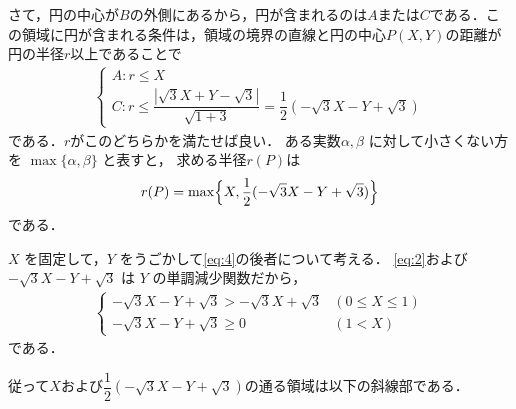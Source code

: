 \documentclass[../../main.tex]{subfiles}
\begin{document}
さて，円の中心が$B$の外側にあるから，円が含まれるのは$A$または$C$である．こ
の領域に円が含まれる条件は，領域の境界の直線と円の中心$P(X,Y)$の距離が円の半径$r$以上であることで
\begin{align}
  \begin{cases}
    A: r \le X \\
    C: r \le \dfrac{|\sqrt{3}X + Y - \sqrt{3}|}{\sqrt{1+3}} = \dfrac{1}{2}(-\sqrt{3}X - Y + \sqrt{3})
  \end{cases} \label{eq:3}
\end{align}
である．$r$がこのどちらかを満たせば良い．
ある実数$\alpha, \beta$ に対して小さくない方を $\max\{\alpha, \beta\}$ と表すと，
求める半径$r(P)$は
\begin{align}
  r(P) = \max\Bigl\{ X, \dfrac{1}{2}(-\sqrt{3}X - Y + \sqrt{3}) \Bigr\} \label{eq:4}
\end{align}
である．

$X$ を固定して，$Y$ をうごかして\cref{eq:4}の後者について考える．
\cref{eq:2}および$-\sqrt{3}X - Y + \sqrt{3}$ は $Y$ の単調減少関数だから，
\begin{align}
  \begin{cases}
    -\sqrt{3}X - Y + \sqrt{3} > -\sqrt{3}X + \sqrt{3} & (0 \le X \le 1) \\
    -\sqrt{3}X - Y + \sqrt{3} \ge 0 & (1 < X)
  \end{cases}
\end{align}
である．

従って$X$および$\dfrac{1}{2}(-\sqrt{3}X - Y + \sqrt{3})$の通る領域は以下の斜線部である．
\end{document}
